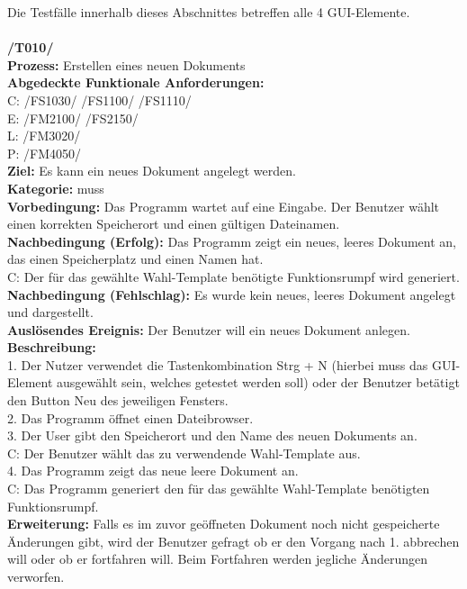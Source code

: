 \documentclass[a4paper]{scrreprt}
\begin{document}
Die Testfälle innerhalb dieses Abschnittes betreffen alle 4 GUI-Elemente. \\\\
\textbf{/T010/}\\
\textbf{Prozess: }Erstellen eines neuen Dokuments  \\
\textbf{Abgedeckte Funktionale Anforderungen:} \\
C: /FS1030/ /FS1100/ /FS1110/ \\
E: /FM2100/	/FS2150/\\
L: /FM3020/ \\
P: /FM4050/	\\
\textbf{Ziel:} Es kann ein neues Dokument angelegt werden.\\
\textbf{Kategorie:} muss\\
\textbf{Vorbedingung:} Das Programm wartet auf eine Eingabe. Der Benutzer wählt einen korrekten Speicherort und einen gültigen Dateinamen.\\
\textbf{Nachbedingung (Erfolg):} Das Programm zeigt ein neues, leeres Dokument an, das einen Speicherplatz und einen Namen hat.\\
C: Der für das gewählte Wahl-Template benötigte Funktionsrumpf wird generiert.
\textbf{Nachbedingung (Fehlschlag):} Es wurde kein neues, leeres Dokument angelegt und dargestellt.\\
\textbf{Auslösendes Ereignis:} Der Benutzer will ein neues Dokument anlegen.\\
\textbf{Beschreibung:} \\
1. Der Nutzer verwendet die Tastenkombination Strg + N (hierbei muss das GUI-Element ausgewählt sein, welches getestet werden soll) oder der Benutzer betätigt den Button Neu des jeweiligen Fensters. \\
2. Das Programm öffnet einen Dateibrowser.\\
3. Der User gibt den Speicherort und den Name des neuen Dokuments an. \\
C: Der Benutzer wählt das zu verwendende Wahl-Template aus.\\
4. Das Programm zeigt das neue leere Dokument an. \\
C: Das Programm generiert den für das gewählte Wahl-Template benötigten Funktionsrumpf. \\
\textbf {Erweiterung:} Falls es im zuvor geöffneten Dokument noch nicht gespeicherte Änderungen gibt, wird der Benutzer gefragt ob er den Vorgang nach 1. abbrechen will oder ob er fortfahren will. Beim Fortfahren werden jegliche Änderungen verworfen. \\
\end{document}
